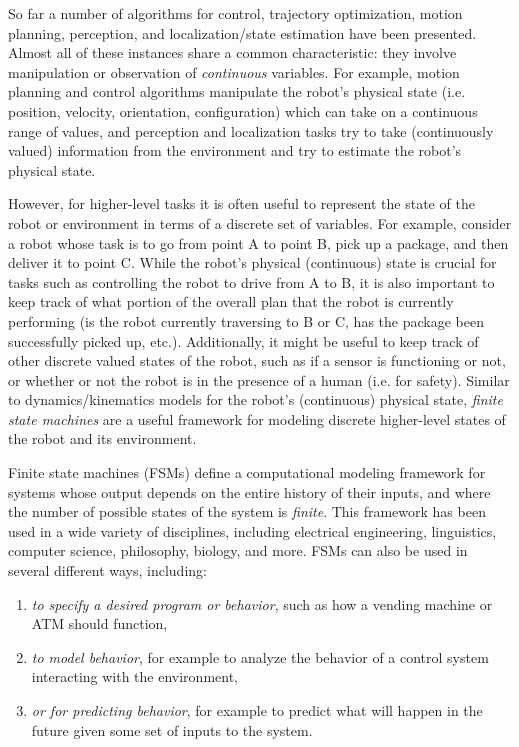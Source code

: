 So far a number of algorithms for control, trajectory optimization, motion planning, perception, and localization/state estimation have been presented. Almost all of these instances share a common characteristic: they involve manipulation or observation of \textit{continuous} variables. For example, motion planning and control algorithms manipulate the robot's physical state (i.e. position, velocity, orientation, configuration) which can take on a continuous range of values, and perception and localization tasks try to take (continuously valued) information from the environment and try to estimate the robot's physical state. 

However, for higher-level tasks it is often useful to represent the state of the robot or environment in terms of a discrete set of variables. For example, consider a robot whose task is to go from point A to point B, pick up a package, and then deliver it to point C. While the robot's physical (continuous) state is crucial for tasks such as controlling the robot to drive from A to B, it is also important to keep track of what portion of the overall plan that the robot is currently performing (is the robot currently traversing to B or C, has the package been successfully picked up, etc.). Additionally, it might be useful to keep track of other discrete valued states of the robot, such as if a sensor is functioning or not, or whether or not the robot is in the presence of a human (i.e. for safety).
Similar to dynamics/kinematics models for the robot's (continuous) physical state, \textit{finite state machines}\cite{KaelblingWhiteEtAl2011} are a useful framework for modeling discrete higher-level states of the robot and its environment.

Finite state machines (FSMs) define a computational modeling framework for systems whose output depends on the entire history of their inputs, and where the number of possible states of the system is \textit{finite}. This framework has been used in a wide variety of disciplines, including electrical engineering, linguistics, computer science, philosophy, biology, and more. FSMs can also be used in several different ways, including:
\begin{enumerate}
    \item {\em to specify a desired program or behavior}, such as how a vending machine or ATM should function,
    \item {\em to model behavior}, for example to analyze the behavior of a control system interacting with the environment,
    \item {\em or for predicting behavior}, for example to predict what will happen in the future given some set of inputs to the system.
\end{enumerate}

